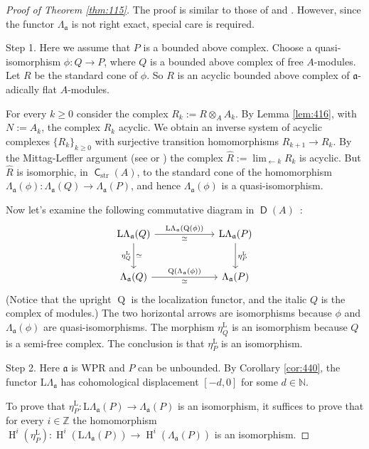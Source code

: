 \documentclass[10pt]{amsart}
\theoremstyle{definition}
\numberwithin{equation}{section}
\newcommand{\lto}{\leftarrow}
\newcommand{\opn}{\operatorname}
\newcommand{\cat}[1]{\operatorname{\mathsf{#1}}}
\newcommand{\mfrak}[1]{\mathfrak{#1}}
\newcommand{\mrm}[1]{\mathrm{#1}}
\newcommand{\La}{\Lambda}
\renewcommand{\a}{\mfrak{a}}
\newcommand{\Z}{\mathbb{Z}}
\newcommand{\N}{\mathbb{N}}
\newcommand{\ot}{\otimes}
\newcommand{\what}[1]{\widehat{#1}}
\begin{document}
\begin{proof}[Proof of Theorem {\rm \ref{thm:115}}]
The proof is similar to those of \cite[Corollary I.5.3]{RD} and
\cite[Lemma 16.1.5]{Ye5}.
However, since the functor $\La_{\a}$ is not right exact, special care is
required.

\medskip \noindent
Step 1. Here we assume that $P$ is a bounded above complex.
Choose a quasi-isomorphism $\phi : Q \to  P$, where $Q$ is a
bounded above complex of free $A$-modules.
Let $R$ be the standard cone of $\phi$. So $R$ is an acyclic bounded above
complex of $\a$-adically flat $A$-modules.

For every $k \geq 0$ consider the complex
$R_k := R \ot_{A} A_{k}$.
By Lemma \ref{lem:416}, with $N := A_k$, the complex $R_k$ acyclic.
We obtain an inverse system of acyclic complexes $\{ R_k \}_{k \geq 0}$
with surjective transition homomorphisms
$R_{k + 1} \to R_k$.
By the Mittag-Leffler argument (see
\cite[Proposition 1.12.4]{KS} or \cite[Corollary 11.1.8]{Ye5})
the complex
$\what{R} := \lim_{\lto k} R_k$ is acyclic.
But $\what{R}$ is isomorphic, in $\cat{C}_{\mrm{str}}(A)$,
to the standard cone of the homomorphism
$\La_{\a}(\phi) : \La_{\a}(Q) \to \La_{\a}(P)$,
and hence $\La_{\a}(\phi)$ is a quasi-isomorphism.

Now let's examine the following commutative diagram in $\cat{D}(A)$~:
\[ \begin{tikzcd} [column sep = 14ex, row sep = 6ex]
\mrm{L} \La_{\a}(Q)
\ar[r, "{\mrm{L} \La_{\a}(\opn{Q}(\phi))}", "{\simeq}"']
\ar[d, "{\eta^{\mrm{L}}_{Q}}"', "{\simeq}"]
&
\mrm{L} \La_{\a}(P)
\ar[d, "{\eta^{\mrm{L}}_{P}}"]
\\
\La_{\a}(Q)
\ar[r, "{\opn{Q}(\La_{\a}(\phi))}", "{\simeq}"']&
\La_{\a}(P)
\end{tikzcd} \]
(Notice that the upright $\opn{Q}$ is the localization functor, and the italic
$Q$ is the complex of modules.)
The two horizontal arrows are isomorphisms because
$\phi$ and $\La_{\a}(\phi)$ are quasi-isomorphisms.
The morphism $\eta^{\mrm{L}}_{Q}$ is an isomorphism because $Q$ is a
semi-free complex.
The conclusion is that
$\eta^{\mrm{L}}_{P}$ is an isomorphism.

\medskip \noindent
Step 2. Here $\a$ is WPR and $P$ can be unbounded.
By Corollary \ref{cor:440}, the functor $\mrm{L} \La_{\a}$ has cohomological
displacement $[-d, 0]$ for some $d \in \N$.

To prove that $\eta^{\mrm{L}}_{P} : \mrm{L} \La_{\a}(P) \to \La_{\a}(P)$
is an isomorphism, it suffices to prove that for every $i \in \Z$ the
homomorphism
$\opn{H}^i(\eta^{\mrm{L}}_{P}) : \opn{H}^i(\mrm{L} \La_{\a}(P)) \to
\opn{H}^i(\La_{\a}(P))$
is an isomorphism.


\end{proof}
\end{document}
